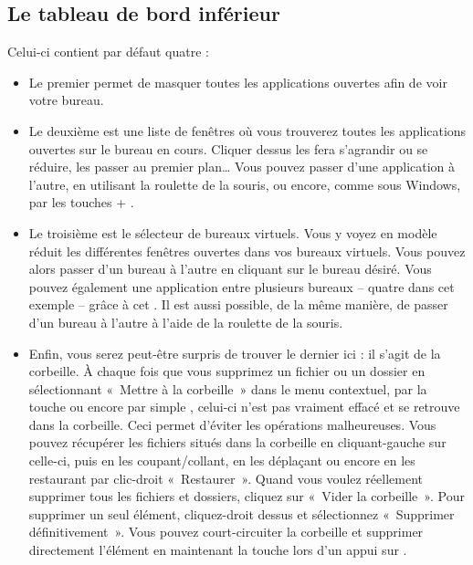 \subsection{Le tableau de bord inférieur}
Celui-ci contient par défaut quatre  :
\begin{itemize}
\item Le premier permet de masquer toutes les applications ouvertes afin de voir votre bureau. 
\item Le deuxième est une liste de fenêtres où vous trouverez toutes les applications ouvertes sur le bureau en cours. Cliquer dessus les fera s'agrandir ou se réduire, les passer au premier plan\ldots{} Vous pouvez passer d'une application à l'autre, en utilisant la roulette de la souris, ou encore, comme sous Windows, par les touches  + .
\item Le troisième est le sélecteur de bureaux virtuels. Vous y voyez en modèle réduit les différentes fenêtres ouvertes dans vos bureaux virtuels. Vous pouvez alors passer d'un bureau à l'autre en cliquant sur le bureau désiré. Vous pouvez également  une application entre plusieurs bureaux -- quatre dans cet exemple -- grâce à cet . Il est aussi possible, de la même manière, de passer d'un bureau à l'autre à l'aide de la roulette de la souris.
\item Enfin, vous serez peut-être surpris de trouver le dernier  ici : il s'agit de la corbeille. À chaque fois que vous supprimez un fichier ou un dossier en sélectionnant «~Mettre à la corbeille~» dans le menu contextuel, par la touche  ou encore par simple , celui-ci n'est pas vraiment effacé et se retrouve dans la corbeille. Ceci permet d'éviter les opérations malheureuses. Vous pouvez récupérer les fichiers situés dans la corbeille en cliquant-gauche sur celle-ci, puis en les coupant/collant, en les déplaçant ou encore en les restaurant par clic-droit \FlecheDroite «~Restaurer~». Quand vous voulez réellement supprimer tous les fichiers et dossiers, cliquez sur «~Vider la corbeille~». Pour supprimer un seul élément, cliquez-droit dessus et sélectionnez «~Supprimer définitivement~». Vous pouvez court-circuiter la corbeille et supprimer directement l'élément en maintenant la touche  lors d'un appui sur .
\end{itemize}
